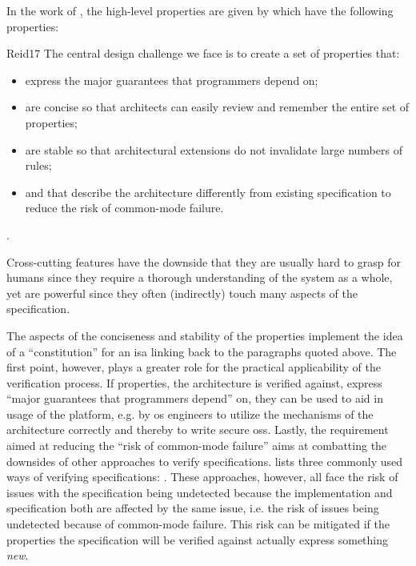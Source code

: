 In the work of \citeauthor{Reid17}, the high-level properties are given by  which have the following properties:

\begin{displaycquote}[pp.88:2-3]{Reid17}
    The central design challenge we face is to create a set of properties that:
    \begin{itemize}
        \item express the major guarantees that programmers depend on;
        \item are concise so that architects can easily review and remember the entire set of properties;
        \item are stable so that architectural extensions do not invalidate large numbers of rules;
        \item and that describe the architecture differently from existing specification to reduce the risk of common-mode failure.
    \end{itemize}
\end{displaycquote}.

Cross-cutting features have the downside that they are usually hard to grasp for humans since they require a thorough understanding of the system as a whole, yet are powerful since they often (indirectly) touch many aspects of the specification.

The aspects of the conciseness and stability of the properties implement the idea of a \enquote{constitution} for an \gls{isa} linking back to the paragraphs quoted above.
The first point, however, plays a greater role for the practical applicability of the verification process.
If properties, the architecture is verified against, express \enquote{major guarantees that programmers  depend} on, they can be used to aid in usage of the platform, e.g. by \gls{os} engineers to utilize the mechanisms of the architecture correctly and thereby to write secure \glspl{os}.
Lastly, the requirement aimed at reducing the \enquote{risk of common-mode failure} aims at combatting the downsides of other approaches to verify specifications.
\citeauthor{Reid17} lists three commonly used ways of verifying specifications: .
These approaches, however, all face the risk of issues with the specification being undetected because the implementation and specification both are affected by the same issue, i.e. the risk of issues being undetected because of common-mode failure.
This risk can be mitigated if the properties the specification will be verified against actually express something \textit{new}.

